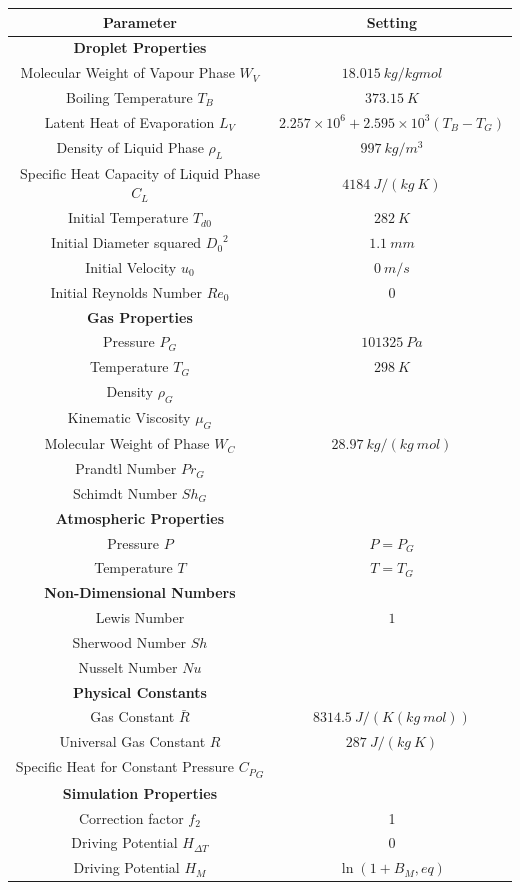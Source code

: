 \documentclass[../Interim_Report_Master]{subfiles}
\begin{document}
\begin{table}[h]
	\centering
	\begin{tabular}{|c c|}
		\hline
		\textbf{Parameter} & \textbf{Setting} \\ \hline
		\textbf{Droplet Properties} &  \\ \hline
		Molecular Weight of Vapour Phase $W_V$ & $18.015~kg/kg mol$ \\ 
		Boiling Temperature $T_B$ & $373.15~K$ \\ 
		Latent Heat of Evaporation $L_V$ & $2.257\times 10^6 + 2.595\times 10^3(T_B-T_G)$\\
		Density of Liquid Phase $\rho_L$ & $997~kg/m^3$ \\
		Specific Heat Capacity of Liquid Phase $C_L$ & $4184~J/(kg~K)$ \\ 
		Initial Temperature $T_{d0}$ & $282~K$ \\ 
		Initial Diameter squared ${D_0}^2$ & $1.1~mm$ \\ 
		Initial Velocity $u_0$ & $0~m/s$ \\ 
		Initial Reynolds Number $Re_0$ & $0$ \\ \hline
		\textbf{Gas Properties} &  \\ \hline
		Pressure $P_G$ & $101325~Pa$ \\ 
		Temperature $T_G$ & $298~K$ \\
		Density $\rho_G$ &  \\ 
		Kinematic Viscosity $\mu_G$ &  \\ 
		Molecular Weight of Phase $W_C$ & $28.97~kg/(kg~mol)$ \\ 
		Prandtl Number $Pr_G$ &  \\ 
		Schimdt Number $Sh_G$ &  \\ \hline
		\textbf{Atmospheric Properties} &  \\ \hline
		Pressure $P$ & $P=P_G$ \\ 
		Temperature $T$ & $T=T_G$ \\ \hline
		\textbf{Non-Dimensional Numbers} &  \\ \hline
		Lewis Number & $1$ \\
		Sherwood Number $Sh$ &  \\ 
		Nusselt Number $Nu$ &  \\ \hline
		\textbf{Physical Constants} &  \\ \hline
		Gas Constant $\bar{R}$ & $8314.5~J/(K(kg~mol))$ \\ 
		Universal Gas Constant $R$ & $287~J/(kg~K)$ \\ 
		Specific Heat for Constant Pressure ${C_P}_G$ &  \\ \hline
		\textbf{Simulation Properties} &  \\ \hline
		Correction factor $f_2$ & 1 \\
		Driving Potential $H_{\Delta T}$ & 0 \\
		Driving Potential $H_M$ & $\ln(1+{B_M,eq})$ \\ \hline
	\end{tabular}
\end{table}
\end{document}
